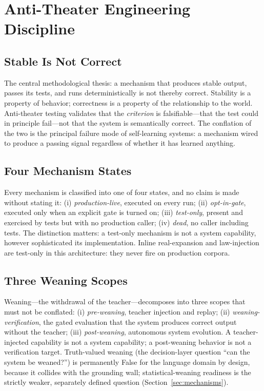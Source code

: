 \documentclass[11pt,a4paper]{article}
\begin{document}
\section{Anti-Theater Engineering Discipline}
\label{sec:antitheater}

\subsection{Stable Is Not Correct}
The central methodological thesis: a mechanism that produces stable
output, passes its tests, and runs deterministically is not thereby
correct. Stability is a property of behavior; correctness is a property
of the relationship to the world. Anti-theater testing validates that the
\emph{criterion} is falsifiable---that the test could in principle
fail---not that the system is semantically correct. The conflation of the
two is the principal failure mode of self-learning systems: a mechanism
wired to produce a passing signal regardless of whether it has learned
anything.

\subsection{Four Mechanism States}
Every mechanism is classified into one of four states, and no claim is
made without stating it: (i) \emph{production-live}, executed on every
run; (ii) \emph{opt-in-gate}, executed only when an explicit gate is
turned on; (iii) \emph{test-only}, present and exercised by tests but
with no production caller; (iv) \emph{dead}, no caller including tests.
The distinction matters: a test-only mechanism is not a system
capability, however sophisticated its implementation. Inline
real-expansion and law-injection are test-only in this architecture: they
never fire on production corpora.

\subsection{Three Weaning Scopes}
Weaning---the withdrawal of the teacher---decomposes into three scopes
that must not be conflated: (i) \emph{pre-weaning}, teacher injection and
replay; (ii) \emph{weaning-verification}, the gated evaluation that the
system produces correct output without the teacher; (iii)
\emph{post-weaning}, autonomous system evolution. A teacher-injected
capability is not a system capability; a post-weaning behavior is not a
verification target. Truth-valued weaning (the decision-layer question
``can the system be weaned?'') is permanently False for the language
domain by design, because it collides with the grounding wall;
statistical-weaning readiness is the strictly weaker, separately defined
question (Section~\ref{sec:mechanisms}).
\end{document}
